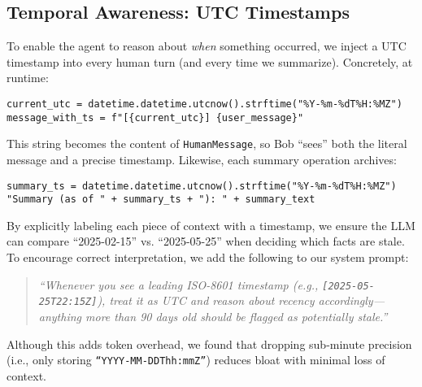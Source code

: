 \documentclass[11pt]{article}
\begin{document}
\subsection{Temporal Awareness: UTC Timestamps}
To enable the agent to reason about \emph{when} something occurred, we inject a UTC timestamp into every human turn (and every time we summarize). Concretely, at runtime:
\begin{verbatim}
current_utc = datetime.datetime.utcnow().strftime("%Y-%m-%dT%H:%MZ")
message_with_ts = f"[{current_utc}] {user_message}"
\end{verbatim}
This string becomes the content of \texttt{HumanMessage}, so Bob “sees” both the literal message and a precise timestamp. Likewise, each summary operation archives:
\begin{verbatim}
summary_ts = datetime.datetime.utcnow().strftime("%Y-%m-%dT%H:%MZ")
"Summary (as of " + summary_ts + "): " + summary_text
\end{verbatim}
By explicitly labeling each piece of context with a timestamp, we ensure the LLM can compare “2025-02-15” vs. “2025-05-25” when deciding which facts are stale. To encourage correct interpretation, we add the following to our system prompt:
\begin{quote}
\textit{“Whenever you see a leading ISO-8601 timestamp (e.g., \texttt{[2025-05-25T22:15Z]}), treat it as UTC and reason about recency accordingly—anything more than 90 days old should be flagged as potentially stale.”}
\end{quote}
Although this adds token overhead, we found that dropping sub-minute precision (i.e., only storing \texttt{“YYYY-MM-DDThh:mmZ”}) reduces bloat with minimal loss of context.
\end{document}
